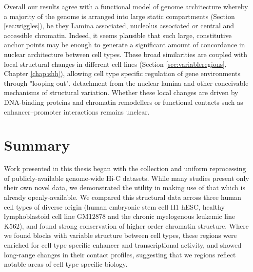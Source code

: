 \documentclass[a4paper,11pt,oneside]{book}
\begin{document}
Overall our results agree with a functional model of genome architecture whereby a majority of the genome is arranged into large static compartments (Section \ref{sec:wiggles}), be they Lamina associated, nucleolus associated or central and accessible chromatin. Indeed, it seems plausible that such large, constitutive anchor points may be enough to generate a significant amount of concordance in nuclear architecture between cell types.\cite{Bouwman2015a} These broad similarities are coupled with local structural changes in different cell lines (Section \ref{sec:variableregions}, Chapter \ref{chap:shh}), allowing cell type specific regulation of gene environments through "looping out", detachment from the nuclear lamina and other conceivable mechanisms of structural variation. Whether these local changes are driven by DNA-binding proteins and chromatin remodellers or functional contacts such as enhancer--promoter interactions remains unclear.

\section{Summary}




Work presented in this thesis began with the collection and uniform reprocessing of publicly-available genome-wide Hi-C datasets. While many studies present only their own novel data, we demonstrated the utility in making use of that which is already openly-available. We compared this structural data across three human cell types of diverse origin (human embryonic stem cell H1 hESC, healthy lymphoblastoid cell line GM12878 and the chronic myelogenous leukemic line K562), and found strong conservation of higher order chromatin structure. Where we found blocks with variable structure between cell types, these regions were enriched for cell type specific enhancer and transcriptional activity, and showed long-range changes in their contact profiles, suggesting that we regions reflect notable areas of cell type specific biology.
 
\end{document}
